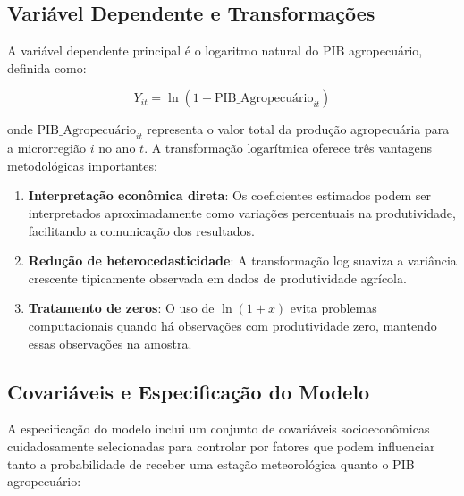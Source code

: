 \documentclass[
	12pt,				%
	oneside,			%
	a4paper,			%
	english,			%
	french,				%
	spanish,			%
	brazil				%
	]{abntex2}
\begin{document}
\subsection{Variável Dependente e Transformações}

A variável dependente principal é o logaritmo natural do PIB agropecuário, definida como:

\begin{equation}
Y_{it} = \ln(1 + \text{PIB\_Agropecuário}_{it})
\end{equation}

onde $\text{PIB\_Agropecuário}_{it}$ representa o valor total da produção agropecuária para a microrregião $i$ no ano $t$. A transformação logarítmica oferece três vantagens metodológicas importantes:

\begin{enumerate}
\item \textbf{Interpretação econômica direta}: Os coeficientes estimados podem ser interpretados aproximadamente como variações percentuais na produtividade, facilitando a comunicação dos resultados.

\item \textbf{Redução de heterocedasticidade}: A transformação log suaviza a variância crescente tipicamente observada em dados de produtividade agrícola.

\item \textbf{Tratamento de zeros}: O uso de $\ln(1+x)$ evita problemas computacionais quando há observações com produtividade zero, mantendo essas observações na amostra.
\end{enumerate}

\subsection{Covariáveis e Especificação do Modelo}

A especificação do modelo inclui um conjunto de covariáveis socioeconômicas cuidadosamente selecionadas para controlar por fatores que podem influenciar tanto a probabilidade de receber uma estação meteorológica quanto o PIB agropecuário:
\end{document}

